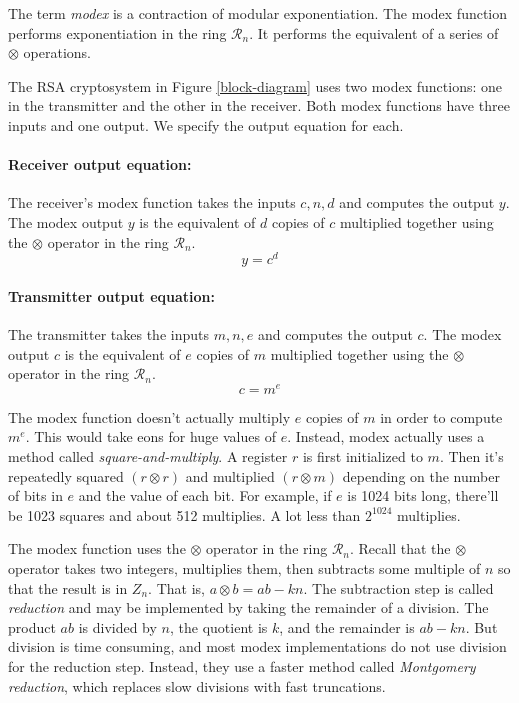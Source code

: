 
The term \emph{modex} is a contraction of modular exponentiation.
The modex function performs exponentiation in the ring $\mathcal{R}_n$.
It performs the equivalent of a series of $\otimes$ operations.

The RSA cryptosystem in Figure \ref{block-diagram} uses two modex functions: 
one in the transmitter and the other in the receiver.
Both modex functions have three inputs and one output.
We specify the output equation for each.

\paragraph{Receiver output equation:}
The receiver's modex function takes the inputs $c,n,d$ and computes the output $y$.
The modex output $y$ is the equivalent of $d$ copies of $c$ multiplied together using 
the $\otimes$ operator in the ring $\mathcal{R}_n$.
\begin{equation} \label{eq:rx-out}
  y = c^d
\end{equation}

\paragraph{Transmitter output equation:}
The transmitter takes the inputs $m,n,e$ and computes the output $c$.
The modex output $c$ is the equivalent of $e$ copies of $m$ multiplied together using 
the $\otimes$ operator in the ring $\mathcal{R}_n$.
\begin{equation} \label{eq:tx-out}
  c = m^e 
\end{equation}

\vspace{4ex}

The modex function doesn't actually multiply $e$ copies of $m$ in order to compute $m^e$.
This would take eons for huge values of $e$.
Instead, modex actually uses a method called \emph{square-and-multiply}.
A register $r$ is first initialized to $m$.
Then it's repeatedly squared $(r \otimes r)$ and multiplied $(r \otimes m)$
depending on the number of bits in $e$ and the value of each bit.
For example, if $e$ is 1024 bits long, there'll be 1023 squares and about 512 multiplies.
A lot less than $2^{1024}$ multiplies.

The modex function uses the $\otimes$ operator in the ring $\mathcal{R}_n$.
Recall that the $\otimes$ operator takes two integers, multiplies them,
then subtracts some multiple of $n$ so that the result is in $Z_n$.
That is, $a \otimes b = ab - kn$.
The subtraction step is called \emph{reduction} and may be implemented
by taking the remainder of a division.
The product $ab$ is divided by $n$, the quotient is $k$, and the remainder is $ab-kn$.
But division is time consuming, and
most modex implementations do not use division for the reduction step.
Instead, they use a faster method called \emph{Montgomery reduction},
which replaces slow divisions with fast truncations.

